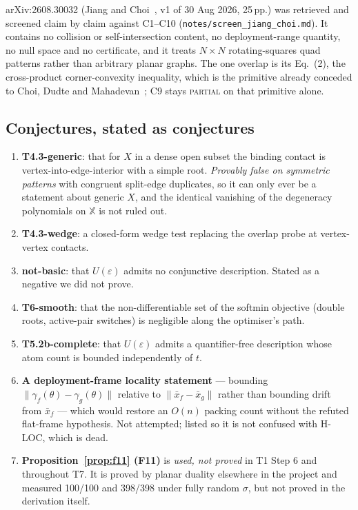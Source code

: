 \documentclass[11pt,a4paper]{article}
\theoremstyle{definition}
\newcommand{\file}[1]{\texttt{\small #1}}
\begin{document}
\begin{enumerate}
arXiv:2608.30032 (Jiang and Choi~\cite{Jiang2026}, v1 of 30 Aug 2026, 25\,pp.) was retrieved and
screened claim by claim against C1--C10 (\file{notes/screen\_jiang\_choi.md}). It contains no
collision or self-intersection content, no deployment-range quantity, no null space and no
certificate, and it treats $N\times N$ rotating-squares quad patterns rather than arbitrary
planar graphs. The one overlap is its Eq.~(2), the cross-product corner-convexity inequality,
which is the primitive already conceded to Choi, Dudte and Mahadevan~\cite{Choi2019}; C9 stays
\textsc{partial} on that primitive alone.
\end{enumerate}

\subsection{Conjectures, stated as conjectures}

\begin{enumerate}\itemsep2pt
\item \textbf{T4.3-generic}: that for $X$ in a dense open subset the binding contact is
vertex-into-edge-interior with a simple root. \emph{Provably false on symmetric patterns} with
congruent split-edge duplicates, so it can only ever be a statement about generic $X$, and the
identical vanishing of the degeneracy polynomials on $\mathbb{X}$ is not ruled out.
\item \textbf{T4.3-wedge}: a closed-form wedge test replacing the overlap probe at
vertex-vertex contacts.
\item \textbf{not-basic}: that $U(\varepsilon)$ admits no conjunctive description. Stated as a
negative we did not prove.
\item \textbf{T6-smooth}: that the non-differentiable set of the softmin objective (double
roots, active-pair switches) is negligible along the optimiser's path.
\item \textbf{T5.2b-complete}: that $U(\varepsilon)$ admits a quantifier-free description whose
atom count is bounded independently of $t$.
\item \textbf{A deployment-frame locality statement} --- bounding
$\|\gamma_f(\theta)-\gamma_g(\theta)\|$ relative to $\|\bar x_f-\bar x_g\|$ rather than
bounding drift from $\bar x_f$ --- which would restore an $O(n)$ packing count without the
refuted flat-frame hypothesis. Not attempted; listed so it is not confused with H-LOC, which
is dead.
\item \textbf{Proposition~\ref{prop:f11} (F11)} is \emph{used, not proved} in T1 Step 6 and
throughout T7. It is proved by planar duality elsewhere in the project and measured 100/100
and 398/398 under fully random $\sigma$, but not proved in the derivation itself.
\end{enumerate}
\end{document}
